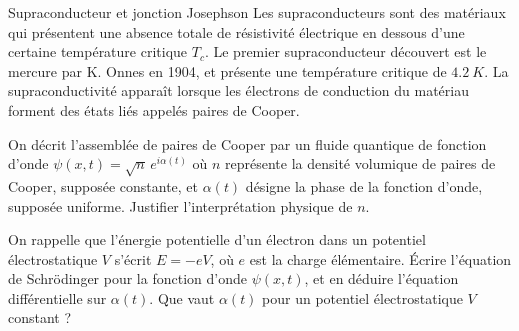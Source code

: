 \begin{exo}[PC][3][colle]{Supraconducteur et jonction Josephson}
  Les supraconducteurs sont des matériaux qui présentent une absence totale de résistivité électrique en dessous d'une certaine température critique $T_c$. Le premier supraconducteur découvert est le mercure par K. Onnes en 1904, et présente une température critique de $\SI{4.2}{K}$.
  La supraconductivité apparaît lorsque les électrons de conduction du matériau forment des états liés appelés paires de Cooper.
  \begin{quest}
    \item	On décrit l’assemblée de paires de Cooper par un fluide quantique de fonction d’onde $\psi(x,t) = \sqrt{n}\,e^{i\alpha(t)}$ où $n$ représente la densité volumique de paires de Cooper, supposée constante, et $\alpha(t)$ désigne la phase de la fonction d’onde, supposée uniforme. Justifier l’interprétation physique de $n$.
    \item On rappelle que l’énergie potentielle d’un électron dans un potentiel électrostatique $V$ s’écrit $E=-eV$, où $e$ est la charge élémentaire. Écrire l’équation de Schrödinger pour la fonction d’onde $\psi(x,t)$, et en déduire l’équation différentielle sur $\alpha(t)$. Que vaut $\alpha(t)$ pour un potentiel électrostatique $V$ constant ? 
\end{quest}
\end{exo}
